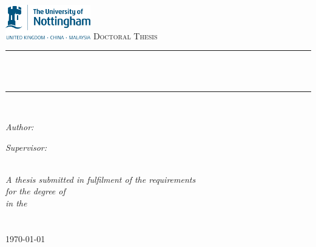 \documentclass[11pt,a4paper,UKenglish,twoside,openright]{Thesis}
\newcommand{\HRule}{\rule{\linewidth}{0.5mm}} %
\begin{document}
\begin{titlepage}

\begin{center}

\includegraphics[height=1.5cm,scale=0.1]{Pictures/2000px-University_of_Nottingham.png}%
\textsc{\Large Doctoral Thesis}\\[0.5cm] %

\HRule \\[0.4cm] %
{\huge \bfseries \ttitle}\\[0.4cm] %
\HRule \\[1.5cm] %
 
\begin{minipage}{0.4\textwidth}
\begin{flushleft} \large
\emph{Author:}\\
{\authornames} %
\end{flushleft}
\end{minipage}
\begin{minipage}{0.4\textwidth}
\begin{flushright} \large
\emph{Supervisor:} \\
{\supname} %
\end{flushright}
\end{minipage}\\[3cm]
 
\large \textit{A thesis submitted in fulfilment of the requirements\\ for the degree of \degreename}\\[0.3cm] %
\textit{in the}\\[0.4cm]
\groupname\\\deptname\\[2cm] %
 
{\large \today}\\[4cm] %
 
\vfill
\end{center}

\end{titlepage}
\end{document}
